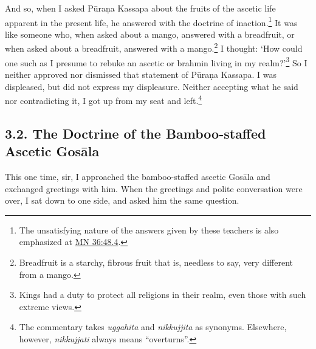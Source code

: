 \documentclass[12pt,openany]{book}%
\begin{document}
And so, when I asked \textsanskrit{Pūraṇa} Kassapa about the fruits of the ascetic life apparent in the present life, he answered with the doctrine of inaction.\footnote{The unsatisfying nature of the answers given by these teachers is also emphasized at \href{https://suttacentral.net/mn36/en/sujato\#48.4}{MN 36:48.4}. } It was like someone who, when asked about a mango, answered with a breadfruit, or when asked about a breadfruit, answered with a mango.\footnote{Breadfruit is a starchy, fibrous fruit that is, needless to say, very different from a mango. } I thought: ‘How could one such as I presume to rebuke an ascetic or brahmin living in my realm?’\footnote{Kings had a duty to protect all religions in their realm, even those with such extreme views. } So I neither approved nor dismissed that statement of \textsanskrit{Pūraṇa} Kassapa. I was displeased, but did not express my displeasure. Neither accepting what he said nor contradicting it, I got up from my seat and left.\footnote{The commentary takes \textit{uggahita} and \textit{nikkujjita} as synonyms. Elsewhere, however, \textit{nikkujjati} always means “overturns”. } 

\subsection*{3.2. The Doctrine of the Bamboo-staffed Ascetic \textsanskrit{Gosāla} }

This one time, sir, I approached the bamboo-staffed ascetic \textsanskrit{Gosāla} and exchanged greetings with him. When the greetings and polite conversation were over, I sat down to one side, and asked him the same question. 
\end{document}
